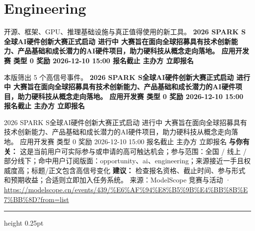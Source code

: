 \documentclass[10.5pt]{ctexart}
\begin{document}
\section*{Engineering}
{\color{ormuted} 开源、框架、GPU、推理基础设施与真正值得使用的新工具。}
\vspace{2mm}
{\LARGE\bfseries 2026 SPARK S全球AI硬件创新大赛正式启动 进行中 大赛旨在面向全球招募具有技术创新能力、产品基础和成长潜力的AI硬件项目，助力硬科技从概念走向落地。 应用开发赛 类型 0 奖励 2026-12-10 15:00 报名截止 主办方 立即报名}\par
\vspace{1mm}
{\color{ormuted} 本版筛出 5 个高信号事件。}
\vspace{3mm}
{\Large\bfseries 2026 SPARK S全球AI硬件创新大赛正式启动 进行中 大赛旨在面向全球招募具有技术创新能力、产品基础和成长潜力的AI硬件项目，助力硬科技从概念走向落地。 应用开发赛 类型 0 奖励 2026-12-10 15:00 报名截止 主办方 立即报名}\par
2026 SPARK S全球AI硬件创新大赛正式启动 进行中 大赛旨在面向全球招募具有技术创新能力、产品基础和成长潜力的AI硬件项目，助力硬科技从概念走向落地。 应用开发赛 类型 0 奖励 2026-12-10 15:00 报名截止 主办方 立即报名
\textbf{与你有关：} 这是当前用户可实际参与或申请的高可触达机会；参与范围：全国 / 线上 / 部分线下；命中用户订阅版面：opportunity、ai、engineering；来源接近一手且权威度高；标题/正文包含高信号变化
\textbf{建议：} 检查报名资格、截止时间、参与形式和预期收益；合适则立即加入任务系统。
{\footnotesize\color{ormuted} 来源：ModelScope 竞赛与活动 · \url{https://modelscope.cn/events/439/%E6%AF%94%E8%B5%9B%E4%BB%8B%E7%BB%8D?from=list}}
\vspace{4mm}
\hrule height 0.25pt
\vspace{3mm}
\end{document}
